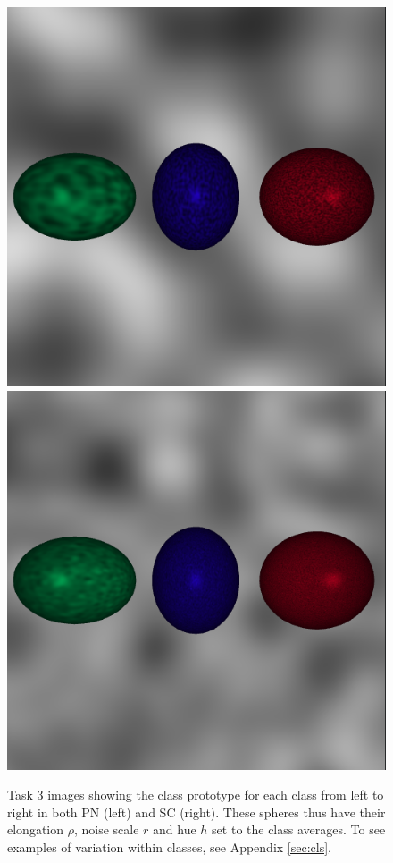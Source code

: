 \documentclass[12pt,fleqn]{article}
\begin{document}
\begin{figure}[H]
    \centering
        \includegraphics[width=.48\linewidth]{t3-avg-perlin}
        \includegraphics[width=.48\linewidth]{t3-avg-sc}
    \caption{
       Task 3 images showing the class prototype for each class from left to right in both PN (left) and SC (right).
       These spheres thus have their elongation $\rho$, noise scale $r$ and hue $h$ set to the class averages.
       To see examples of variation within classes, see Appendix \ref{sec:cls}.
    }
    \label{fig:t3}
\end{figure}\noindent
\end{document}
